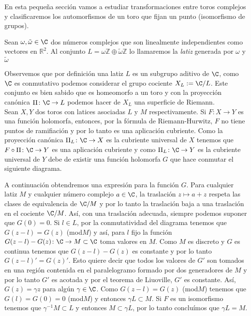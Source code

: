 En esta pequeña sección vamos a estudiar transformaciones entre toros complejos y clasificaremos los automorfismos de un toro que fijan un punto (isomorfismo de grupos).

\begin{defn}
\label{latiz}
Sean $\omega,\tilde{\omega}\in\C$ dos números complejos que son linealmente independientes como vectores en $\mathbb{R}^{2}$. Al conjunto $L=\omega\mathbb{Z}\oplus\tilde{\omega}\mathbb{Z}$ lo llamaremos la \emph{latiz} generada por $\omega$ y $\tilde{\omega}$
\end{defn}

Observemos que por definición una latiz $L$ es un subgrupo aditivo de $\C$, como $\C$ es conmutativo podemos considerar el grupo cociente $X_{L}:=\C/L$. Este conjunto es bien sabido que es homeomorfo a un toro y con la proyección canónica $\Pi\colon\C\rightarrow L$ podemos hacer de $X_{L}$ una superficie de Riemann.\\

Sean $X,Y$ dos toros con latices asociadas $L$ y $M$ respectivamente. Si $F\colon X\rightarrow Y$ es una función holomorfa, entonces, por la fórmula de Riemann-Hurwitz, $F$ no tiene puntos de ramifiación y por lo tanto es una aplicación cubriente. Como la proyección canónica $\Pi_{L}\colon\C\rightarrow X$ es la  cubriente universal de $X$ tenemos que $F\circ\Pi\colon\C\rightarrow Y$ es una aplicación cubriente y como $\Pi_{L}\colon\C\rightarrow Y$ es la cubriente universal de $Y$ debe de existir una función holomorfa $G$ que hace conmutar el siguiente diagrama.


A continuación obtendremos una expresión para la función $G$. Para cualquier latiz $M$ y cualquier número complejo $a\in\C$, la traslación $z\mapsto a+z$ respeta las clases de equivalencia de $\C/M$ y por lo tanto la traslación baja a una traslación en el cociente $\C/M$. Así, con una traslación adecuada, siempre podemos suponer que $G(0)=0$. Si $l\in L$, por la conmutatividad del diagrama tenemos que $G(z-l)=G(z)$ (mod$M$) y así, para $l$ fijo la función $G(z-l)-G(z)\colon\C\rightarrow M\subset\C$ toma valores en $M$. Como $M$ es discreto y $G$ es continua tenemos que $G(z-l)-G(z)$ es constante y por lo tanto $G(z-l)'=G(z)'$. Esto quiere decir que todos los valores de $G'$ son tomados en una región contenida en el paralelogramo formado por dos generadores de $M$ y por lo tanto $G'$ es acotada y por el teorema de Liuoville, $G'$ es constante. Así, $G(z)=\gamma z$ para algún $\gamma\in\C$. Como $G(z-l)=G(z)$ (mod$M$) tenemos que $G(l)=G(0)=0$ (mod$M$) y entonces $\gamma L\subset M$. Si $F$ es un isomorfismo tenemos que $\gamma^{-1}M\subset L$ y entonces $M\subset\gamma L$, por lo tanto concluímos que $\gamma L = M$.\\

